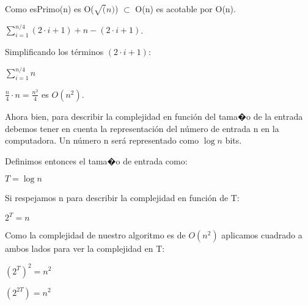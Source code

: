 \documentclass[11pt, a4paper, spanish]{article}
\begin{document}
	\begin{center}
	Como esPrimo(n) es O($\sqrt(n)$) $\subset$ O(n) es acotable por O(n).\\
	\end{center}

	\begin{center}
	$\displaystyle\sum\limits_{i=1}^{n/4} (2 \cdot i+1) + n - (2 \cdot i+1)$.\\
	\end{center}
	
	\begin{center}
	Simplificando los t\'erminos $(2 \cdot i+1) $:\\
	\end{center}

	\begin{center}
  $\displaystyle\sum\limits_{i=1}^{n/4} n$\\
	\end{center}
	
	\begin{center}
	$\frac{n}{4} \cdot n = {\frac{n^2}{4}}$ es $O(n^2)$.\\ 
	\end{center}
	
	Ahora bien, para describir la complejidad en funci\'on del tama�o de la entrada debemos tener en cuenta la representaci\'on del n\'umero de entrada n en la computadora.
	Un n\'umero n ser\'a representado como $\log n$ bits.
	
	Definimos entonces el tama�o de entrada como:\\
	
	\begin{center}
	$T = \log n$\\
	\end{center}
	
	Si respejamos n para describir la complejidad en funci\'on de T:
	
	\begin{center}
	$2^T = n$\\
	\end{center}
	
	Como la complejidad de nuestro algoritmo es de $O(n^2)$ aplicamos cuadrado a ambos lados para ver la complejidad en T:
	
	\begin{center}
	$(2^T)^2 = n^2$\\
	\end{center}
	
	\begin{center}
	$(2^{2T}) = n^2$\\
	\end{center}
	
\end{document}
